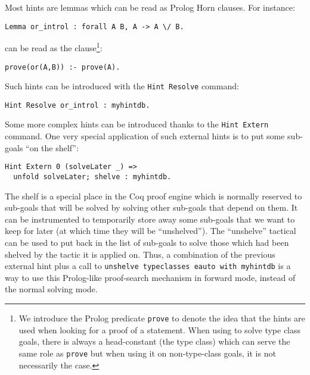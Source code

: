 \documentclass[nocopyrightspace,blockstyle,numbers]{sigplanconf}
\begin{document}
Most hints are lemmas which can be read as Prolog Horn clauses.
For instance:

\begin{verbatim}
Lemma or_introl : forall A B, A -> A \/ B.
\end{verbatim}
can be read as the clause\footnote{We introduce the Prolog predicate
  \texttt{prove} to denote the idea that the hints are used when looking
  for a proof of a statement. When using  to
  solve type class goals, there is always a head-constant (the type class)
  which can serve the same role as \texttt{prove} but when using it on
  non-type-class goals, it is not necessarily the case.}:

\begin{verbatim}
prove(or(A,B)) :- prove(A).
\end{verbatim}
Such hints can be introduced with the \texttt{Hint Resolve} command:

\begin{verbatim}
Hint Resolve or_introl : myhintdb.
\end{verbatim}

Some more complex hints can be introduced thanks to the
\texttt{Hint Extern} command. One very special application of
such external hints is to put some sub-goals ``on the shelf'':

\begin{verbatim}
Hint Extern 0 (solveLater _) =>
  unfold solveLater; shelve : myhintdb.
\end{verbatim}

The shelf is a special place in the Coq proof engine which is
normally reserved to sub-goals that will be solved by solving other
sub-goals that depend on them. It can be instrumented to temporarily
store away some sub-goals that we want to keep for later (at which
time they will be ``unshelved'').
The ``unshelve'' tactical can be used to put back in the list of
sub-goals to solve those which had been shelved by the tactic it is
applied on.
Thus, a combination of the previous external hint plus a call to
\texttt{unshelve typeclasses eauto with myhintdb} is a way to use
this Prolog-like proof-search mechanism in forward mode, instead of
the normal solving mode.
\end{document}
